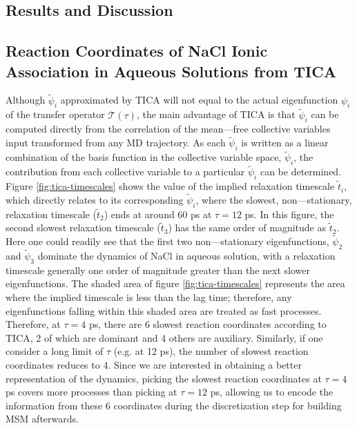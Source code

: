 \begin{spacing}{2.0}
    \section{Results and Discussion}

    \subsection{Reaction Coordinates of NaCl Ionic Association in Aqueous Solutions from TICA}

    Although $\tilde{\psi}_i$ approximated by TICA will not equal to the actual eigenfunction $\psi_i$ of the transfer operator $\mathcal{T}(\tau)$, 
    the main advantage of TICA is that $\tilde{\psi}_i$ can be computed directly from the correlation of the mean—free collective variables input 
    transformed from any MD trajectory. As each $\tilde{\psi}_i$ is written as a linear combination of the basis function in the collective variable 
    space, $\tilde{\psi}_i$, the contribution from each collective variable to a particular $\tilde{\psi}_i$ can be determined. Figure 
    \ref{fig:tica-timescales} shows the value of the implied relaxation timescale $\tilde{t}_i$, which directly relates to its corresponding 
    $\tilde{\psi}_i$, where the slowest, non—stationary, relaxation timescale ($\tilde{t}_2$) ends at around 60 ps at $\tau = 12$ ps. In this 
    figure, the second slowest relaxation timescale ($\tilde{t}_3$) has the same order of magnitude as $\tilde{t}_2$. Here one could readily see 
    that the first two non—stationary eigenfunctions, $\tilde{\psi}_2$ and $\tilde{\psi}_3$ dominate the dynamics of NaCl in aqueous solution, 
    with a relaxation timescale generally one order of magnitude greater than the next slower eigenfunctions. The shaded area of figure 
    \ref{fig:tica-timescales} represents the area where the implied timescale is less than the lag time; therefore, any eigenfunctions falling 
    within this shaded area are treated as fast processes. Therefore, at $\tau = 4$ ps, there are 6 slowest reaction coordinates according to TICA, 
    2 of which are dominant and 4 others are auxiliary. Similarly, if one consider a long limit of $\tau$ (e.g. at 12 ps), the number of slowest 
    reaction coordinates reduces to 4. Since we are interested in obtaining a better representation of the dynamics, picking the slowest reaction 
    coordinates at $\tau = 4$ ps covers more processes than picking at $\tau = 12$ ps, allowing us to encode the information from these 6 coordinates 
    during the discretization step for building MSM afterwards.


\end{spacing}
